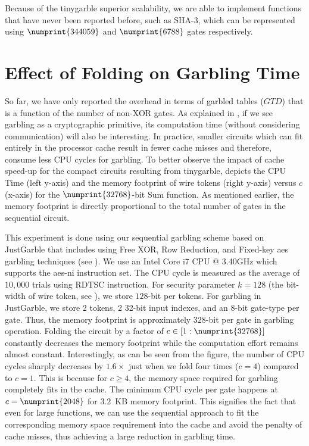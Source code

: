 Because of the \gls{tinygarble} superior scalability, we are able to implement functions that have never been reported before, such as SHA-3, which can be represented using $\numprint{344059}$ and $\numprint{6788}$ gates respectively.

\section{Effect of Folding on Garbling Time}
So far, we have only reported the overhead in terms of garbled tables ($\mathit{GTD}$) that is a function of the number of non-XOR gates.
As explained in \cite{bellare2013efficient}, if we see garbling as a cryptographic primitive, its computation time (without considering communication) will also be interesting.
In practice, smaller circuits which can fit entirely in the processor cache result in fewer cache misses and therefore, consume less CPU cycles for garbling.
To better observe the impact of cache speed-up for the compact circuits resulting from \gls{tinygarble},  depicts the CPU Time (left y-axis) and the memory footprint of wire tokens (right y-axis) versus $c$ (x-axis) for the $\numprint{32768}$-bit Sum function.
As mentioned earlier, the memory footprint is directly proportional to the total number of gates in the sequential circuit.

This experiment is done using our sequential garbling scheme based on JustGarble \cite{bellare2013efficient} that includes using Free XOR, Row Reduction, and Fixed-key \acrshort{aes} garbling techniques (see ).
We use an Intel Core i7 CPU @ 3.40GHz which supports the \acrshort{aes-ni} instruction set.
The CPU cycle is measured as the average of $10,000$ trials using RDTSC instruction.
For security parameter $k=128$ (the bit-width of wire token, see ), we store $128$-bit per tokens.
For garbling in JustGarble, we store 2 tokens, 2 32-bit input indexes, and an 8-bit gate-type per gate.
Thus, the memory footprint is approximately $328$-bit per gate in garbling operation.
Folding the circuit by a factor of $c \in [1:\numprint{32768}]$ constantly decreases the memory footprint while the computation effort remains almost constant.
Interestingly, as can be seen from the figure, the number of CPU cycles sharply decreases by $1.6\times$ just when we fold four times ($c=4$) compared to $c=1$.
This is because for $c \geq 4$, the memory space required for garbling completely fits in the cache.
The minimum CPU cycle per gate happens at $c=\numprint{2048}$ for $3.2$~KB memory footprint.
This signifies the fact that even for large functions, we can use the sequential approach to fit the corresponding memory space requirement into the cache and avoid the penalty of cache misses, thus achieving a large reduction in garbling time.

